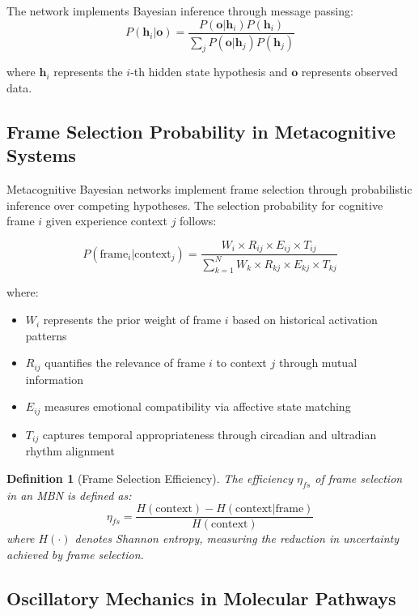\documentclass[12pt,a4paper]{article}
\newtheorem{definition}{Definition}[section]
\begin{document}
The network implements Bayesian inference through message passing:
\begin{equation}
P(\mathbf{h}_i | \mathbf{o}) = \frac{P(\mathbf{o} | \mathbf{h}_i) P(\mathbf{h}_i)}{\sum_j P(\mathbf{o} | \mathbf{h}_j) P(\mathbf{h}_j)}
\end{equation}

where $\mathbf{h}_i$ represents the $i$-th hidden state hypothesis and $\mathbf{o}$ represents observed data.

\subsection{Frame Selection Probability in Metacognitive Systems}

Metacognitive Bayesian networks implement frame selection through probabilistic inference over competing hypotheses. The selection probability for cognitive frame $i$ given experience context $j$ follows:

\begin{equation}
P(\text{frame}_i | \text{context}_j) = \frac{W_i \times R_{ij} \times E_{ij} \times T_{ij}}{\sum_{k=1}^{N} W_k \times R_{kj} \times E_{kj} \times T_{kj}}
\end{equation}

where:
\begin{itemize}
\item $W_i$ represents the prior weight of frame $i$ based on historical activation patterns
\item $R_{ij}$ quantifies the relevance of frame $i$ to context $j$ through mutual information
\item $E_{ij}$ measures emotional compatibility via affective state matching
\item $T_{ij}$ captures temporal appropriateness through circadian and ultradian rhythm alignment
\end{itemize}

\begin{definition}[Frame Selection Efficiency]
The efficiency $\eta_{fs}$ of frame selection in an MBN is defined as:
\begin{equation}
\eta_{fs} = \frac{H(\text{context}) - H(\text{context} | \text{frame})}{H(\text{context})}
\end{equation}
where $H(\cdot)$ denotes Shannon entropy, measuring the reduction in uncertainty achieved by frame selection.
\end{definition}

\subsection{Oscillatory Mechanics in Molecular Pathways}
\end{document}
